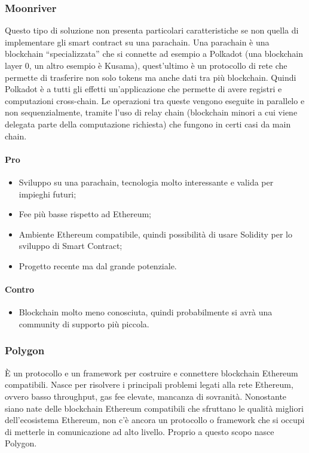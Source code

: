 		\subsubsection{Moonriver}
		Questo tipo di soluzione non presenta particolari caratteristiche se non quella di implementare gli smart contract\glo{} su una parachain. Una parachain è una blockchain\glo{} “specializzata” che si connette ad esempio a Polkadot (una blockchain\glo{} layer 0\glo{}, un altro esempio è Kusama), quest'ultimo è un protocollo di rete che permette di trasferire non solo tokens\glo{} ma anche dati tra più blockchain\glo{}. Quindi Polkadot è a tutti gli effetti un'applicazione che permette di avere registri e computazioni cross-chain.
		Le operazioni tra queste vengono eseguite in parallelo e non sequenzialmente, tramite l'uso di relay chain (blockchain\glo{} minori a cui viene delegata parte della computazione richiesta) che fungono in certi casi da main chain.
		\paragraph{Pro}
		\begin{itemize}
			\item Sviluppo su una parachain, tecnologia molto interessante e valida per impieghi futuri;
			\item Fee più basse rispetto ad Ethereum\glo{};
			\item Ambiente Ethereum\glo{} compatibile, quindi possibilità di usare Solidity\glo{} per lo sviluppo di Smart Contract\glo{};
			\item Progetto recente ma dal grande potenziale.
		\end{itemize}
		\paragraph{Contro}
		\begin{itemize}
			\item Blockchain\glo{} molto meno conosciuta, quindi probabilmente si avrà una community di supporto più piccola.
		\end{itemize}
		
		\subsubsection{Polygon}
		È un protocollo e un framework per costruire e connettere blockchain\glo{} Ethereum\glo{} compatibili. Nasce per risolvere i principali problemi legati alla rete Ethereum\glo{}, ovvero basso throughput, gas fee elevate, mancanza di sovranità.
		Nonostante siano nate delle blockchain\glo{} Ethereum\glo{} compatibili che sfruttano le qualità migliori dell'ecosistema Ethereum\glo{}, non c'è ancora un protocollo o framework che si occupi di metterle in comunicazione ad alto livello. Proprio a questo scopo nasce Polygon\glo{}.
	
